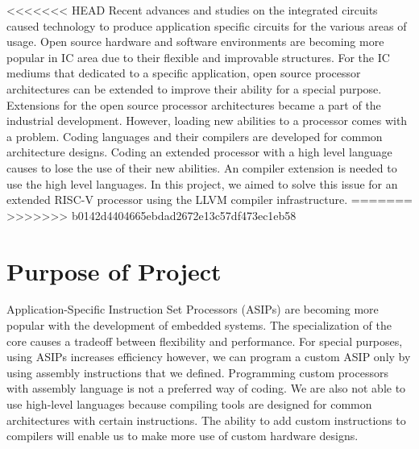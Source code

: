 <<<<<<< HEAD
Recent advances and studies on the integrated circuits caused technology to produce application specific circuits for the various areas of usage. Open source hardware and software environments are becoming more popular in IC area due to their flexible and improvable structures. For the IC mediums that dedicated to a specific application, open source processor architectures can be extended to improve their ability for a special purpose. Extensions for the open source processor architectures became a part of the industrial development. However, loading new abilities to a processor comes with a problem. Coding languages and their compilers are developed for common architecture designs. Coding an extended processor with a high level language causes to lose the use of their new abilities. An compiler extension is needed to use the high level languages. In this project, we aimed to solve this issue for an extended RISC-V processor using the LLVM compiler infrastructure. 
=======
>>>>>>> b0142d4404665ebdad2672e13c57df473ec1eb58
\section{Purpose of Project}
Application-Specific Instruction Set Processors (ASIPs) are becoming more popular with the development of embedded systems. The specialization of the core causes a tradeoff between flexibility and performance. For special purposes, using ASIPs increases efficiency however, we can program a custom ASIP only by using assembly instructions that we defined. Programming custom processors with assembly language is not a preferred way of coding. We are also not able to use high-level languages because compiling tools are designed for common architectures with certain instructions. The ability to add custom instructions to compilers will enable us to make more use of custom hardware designs.

